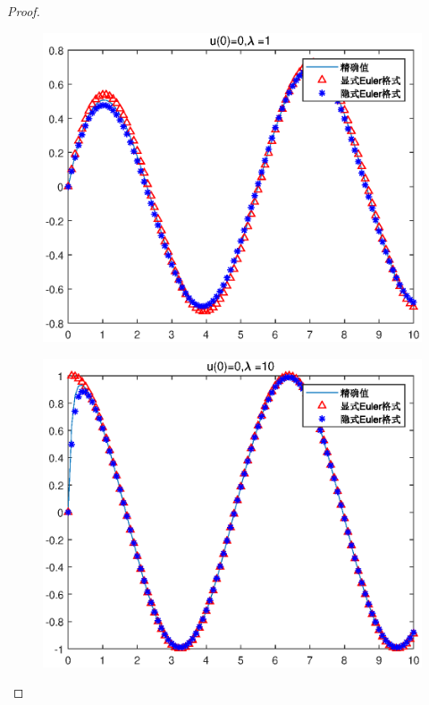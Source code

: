 \documentclass{article}%
\begin{document}
\begin{proof}
    
    \begin{figure}
    	\includegraphics[width=1\linewidth]{pic/week7_1_1.eps}
    	\label{Fig:1}
    	\caption{} 
    \end{figure}
\begin{figure}
	\includegraphics[width=1\linewidth]{pic/week7_1_2.eps}
	\label{Fig:2}
	\caption{} 
\end{figure}
\begin{figure}

\end{figure}
\end{proof}
\end{document}
